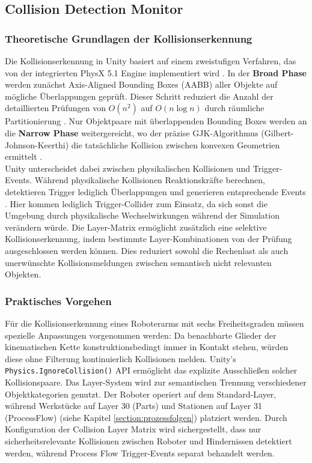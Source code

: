 \subsection{Collision Detection Monitor}
\subsubsection{Theoretische Grundlagen der Kollisionserkennung}
\noindent
Die Kollisionserkennung in Unity basiert auf einem zweistufigen Verfahren, das
von der integrierten PhysX 5.1 Engine implementiert wird
. In der \textbf{Broad Phase} werden zunächst
Axis-Aligned Bounding Boxes (AABB) aller Objekte auf mögliche Überlappungen
geprüft. Dieser Schritt reduziert die Anzahl der detaillierten Prüfungen von
$O(n^2)$ auf $O(n \log n)$ durch räumliche Partitionierung
. Nur Objektpaare mit überlappenden Bounding Boxes
werden an die \textbf{Narrow Phase} weitergereicht, wo der präzise
GJK-Algorithmus (Gilbert-Johnson-Keerthi) die tatsächliche Kollision zwischen
konvexen Geometrien ermittelt .\\

\noindent
Unity unterscheidet dabei zwischen physikalischen Kollisionen und
Trigger-Events. Während physikalische Kollisionen Reaktionskräfte berechnen,
detektieren Trigger lediglich Überlappungen und generieren entsprechende Events
. Hier kommen lediglich Trigger-Collider zum Einsatz,
da sich sonst die Umgebung durch physikalische Wechselwirkungen während der
Simulation verändern würde. Die Layer-Matrix ermöglicht zusätzlich eine selektive
Kollisionserkennung, indem bestimmte Layer-Kombinationen von der Prüfung
ausgeschlossen werden können. Dies reduziert sowohl die Rechenlast als auch
unerwünschte Kollisionsmeldungen zwischen semantisch nicht relevanten Objekten.

\subsubsection{Praktisches Vorgehen}
\noindent
Für die Kollisionserkennung eines Roboterarms mit sechs Freiheitsgraden müssen
spezielle Anpassungen vorgenommen werden: Da benachbarte Glieder der
kinematischen Kette konstruktionsbedingt immer in Kontakt stehen, würden diese
ohne Filterung kontinuierlich Kollisionen melden. Unity's
\texttt{Physics.IgnoreCollision()} API ermöglicht das explizite Ausschließen
solcher Kollisionspaare.
\noindent
Das Layer-System wird zur semantischen Trennung verschiedener Objektkategorien
genutzt. Der Roboter operiert auf dem Standard-Layer, während Werkstücke auf
Layer 30 (Parts) und Stationen auf Layer 31 (ProcessFlow) (siehe Kapitel
\ref{section:prozessfolgen}) platziert werden.
Durch Konfiguration der Collision Layer Matrix wird sichergestellt, dass nur
sicherheitsrelevante Kollisionen zwischen Roboter und Hindernissen detektiert
werden, während Process Flow Trigger-Events separat behandelt werden.

